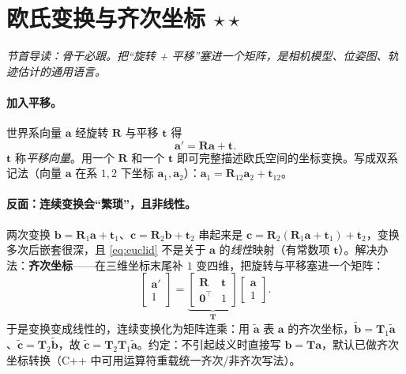 \section{欧氏变换与齐次坐标 \texorpdfstring{$\star\star$}{**}}
\label{sec:rb-se3}
\noindent\emph{节首导读：骨干必跟。把“旋转 + 平移”塞进一个矩阵，是相机模型、位姿图、轨迹估计的通用语言。}

\paragraph{加入平移。}世界系向量 $\mathbf{a}$ 经旋转 $\mathbf{R}$ 与平移 $\mathbf{t}$ 得
\begin{equation}
  \mathbf{a}'=\mathbf{R}\mathbf{a}+\mathbf{t}.
  \label{eq:euclid}
\end{equation}
$\mathbf{t}$ 称\emph{平移向量}。用一个 $\mathbf{R}$ 和一个 $\mathbf{t}$ 即可完整描述欧氏空间的坐标变换。写成双系记法（向量 $\mathbf{a}$ 在系 $1,2$ 下坐标 $\mathbf{a}_1,\mathbf{a}_2$）：$\mathbf{a}_1=\mathbf{R}_{12}\mathbf{a}_2+\mathbf{t}_{12}$\cite{gaoxiang2019slam14}。

\paragraph{反面：连续变换会“繁琐”，且非线性。}两次变换 $\mathbf{b}=\mathbf{R}_1\mathbf{a}+\mathbf{t}_1$、$\mathbf{c}=\mathbf{R}_2\mathbf{b}+\mathbf{t}_2$ 串起来是 $\mathbf{c}=\mathbf{R}_2(\mathbf{R}_1\mathbf{a}+\mathbf{t}_1)+\mathbf{t}_2$，变换多次后嵌套很深，且 \cref{eq:euclid} 不是关于 $\mathbf{a}$ 的\emph{线性}映射（有常数项 $\mathbf{t}$）。解决办法：\textbf{齐次坐标}——在三维坐标末尾补 $1$ 变四维，把旋转与平移塞进一个矩阵：
\begin{equation}
  \begin{bmatrix}\mathbf{a}'\\1\end{bmatrix}
  =\underbrace{\begin{bmatrix}\mathbf{R}&\mathbf{t}\\\mathbf{0}^\top&1\end{bmatrix}}_{\mathbf{T}}
  \begin{bmatrix}\mathbf{a}\\1\end{bmatrix}.
  \label{eq:homo}
\end{equation}
于是变换变成线性的，连续变换化为矩阵连乘：用 $\tilde{\mathbf{a}}$ 表 $\mathbf{a}$ 的齐次坐标，$\tilde{\mathbf{b}}=\mathbf{T}_1\tilde{\mathbf{a}}$、$\tilde{\mathbf{c}}=\mathbf{T}_2\tilde{\mathbf{b}}$，故 $\tilde{\mathbf{c}}=\mathbf{T}_2\mathbf{T}_1\tilde{\mathbf{a}}$。约定：不引起歧义时直接写 $\mathbf{b}=\mathbf{T}\mathbf{a}$，默认已做齐次坐标转换（C++ 中可用运算符重载统一齐次/非齐次写法）。

